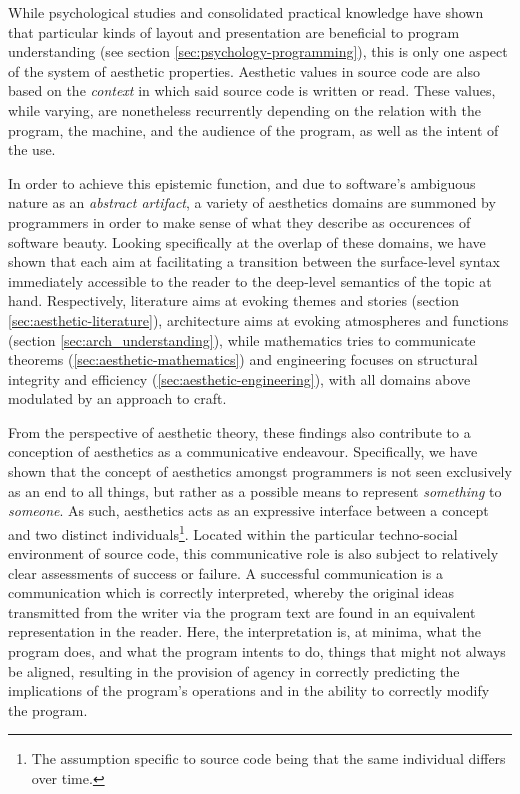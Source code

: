 While psychological studies and consolidated practical knowledge have shown that particular kinds of layout and presentation are beneficial to program understanding (see section \ref{sec:psychology-programming}), this is only one aspect of the system of aesthetic properties. Aesthetic values in source code are also based on the \emph{context} in which said source code is written or read. These values, while varying, are nonetheless recurrently depending on the relation with the program, the machine, and the audience of the program, as well as the intent of the use.

In order to achieve this epistemic function, and due to software's ambiguous nature as an \emph{abstract artifact}, a variety of aesthetics domains are summoned by programmers in order to make sense of what they describe as occurences of software beauty. Looking specifically at the overlap of these domains, we have shown that each aim at facilitating a transition between the surface-level syntax immediately accessible to the reader to the deep-level semantics of the topic at hand. Respectively, literature aims at evoking themes and stories (section \ref{sec:aesthetic-literature}), architecture aims at evoking atmospheres and functions (section \ref{sec:arch_understanding}), while mathematics tries to communicate theorems (\ref{sec:aesthetic-mathematics}) and engineering focuses on structural integrity and efficiency (\ref{sec:aesthetic-engineering}), with all domains above modulated by an approach to craft.

From the perspective of aesthetic theory, these findings also contribute to a conception of aesthetics as a communicative endeavour. Specifically, we have shown that the concept of aesthetics amongst programmers is not seen exclusively as an end to all things, but rather as a possible means to represent \emph{something} to \emph{someone}. As such, aesthetics acts as an expressive interface between a concept and two distinct individuals\footnote{The assumption specific to source code being that the same individual differs over time.}. Located within the particular techno-social environment of source code, this communicative role is also subject to relatively clear assessments of success or failure. A successful communication is a communication which is correctly interpreted, whereby the original ideas transmitted from the writer via the program text are found in an equivalent representation in the reader. Here, the interpretation is, at minima, what the program does, and what the program intents to do, things that might not always be aligned, resulting in the provision of agency in correctly predicting the implications of the program's operations and in the ability to correctly modify the program.

